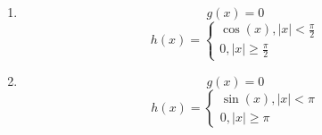 \documentclass{article}
\theoremstyle{definition}
\newenvironment{boldenv}{\bfseries\boldmath}{}
\begin{document}
\begin{boldenv}
\begin{enumerate}[start=7, resume*=problems]
        \item
        \[g(x) = 0\] \begin{equation*}
        h(x) =
        \begin{cases}
            \cos{(x)}, |x|<\frac{\pi}{2}\\
            0, |x|\geq\frac{\pi}{2}
        \end{cases}
        \end{equation*}
        
        \item
        \[g(x) = 0\] \begin{equation*}
        h(x) =
        \begin{cases}
            \sin{(x)}, |x|<\pi\\
            0, |x|\geq\pi
        \end{cases}
        \end{equation*}
    \end{enumerate}
\end{boldenv}
\end{document}
